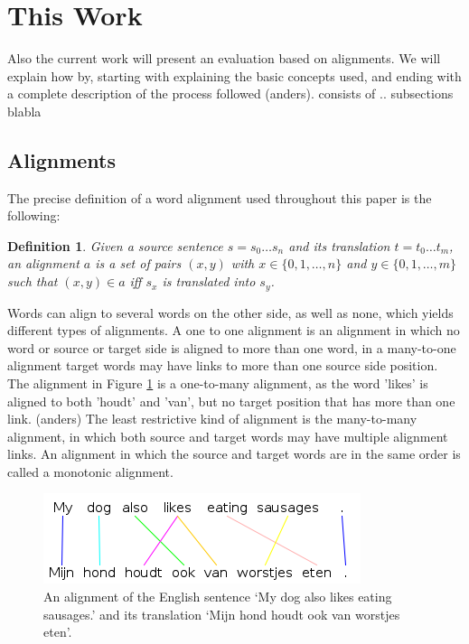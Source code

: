 \documentclass{report}
\theoremstyle{definition}
\theoremstyle{plain}
\newtheorem{definition}{Definition}
\begin{document}


\section{This Work}

Also the current work will present an evaluation based on alignments. We will explain how by, starting with explaining the basic concepts used, and ending with a complete description of the process followed (anders).
consists of .. subsections blabla

\subsection{Alignments}

The precise definition of a word alignment used throughout this paper is the following:

\begin{definition}
Given a source sentence $s = s_0 \ldots s_n$ and its translation $t = t_0 \ldots t_m$, an alignment $a$ is a set of pairs $(x,y)$ with $x\in \{0,1,\ldots,n\}$ and $y\in \{0,1,\ldots,m\}$ such that $(x,y)\in a$ iff $s_x$ is translated into $s_y$.
\end{definition}

Words can align to several words on the other side, as well as none, which yields different types of alignments. A one to one alignment is an alignment in which no word or source or target side is aligned to more than one word, in a many-to-one alignment target words may have links to more than one source side position. The alignment in Figure \ref{fig:alignment} is a one-to-many alignment, as the word 'likes' is aligned to both 'houdt' and 'van', but no target position that has more than one link. (anders) The least restrictive kind of alignment is the many-to-many alignment, in which both source and target words may have multiple alignment links. An alignment in which the source and target words are in the same order is called a monotonic alignment. 

\begin{figure}[!ht]
\centering
\includegraphics[scale=0.6]{alignment.png}
\caption{An alignment of the English sentence `My dog also likes eating sausages.' and its translation `Mijn hond houdt ook van worstjes eten'.%
}\label{fig:alignment}
\end{figure}
\end{document}
